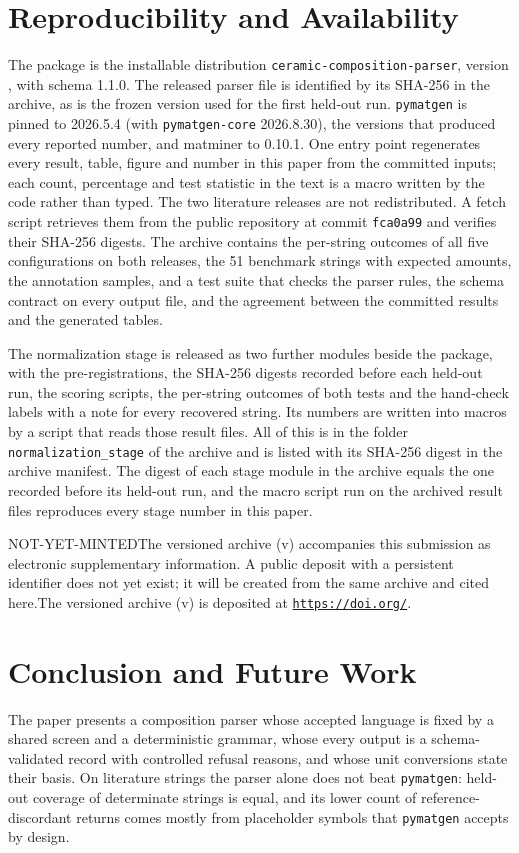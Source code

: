\documentclass[10pt,journal]{IEEEtran}
\newcommand{\pmg}{\texttt{pymatgen}\xspace}
\def\depositdoiPLACEHOLDER{NOT-YET-MINTED}
\newcommand{\depositis}[2]{\ifx\depositdoi\depositdoiPLACEHOLDER #1\else #2\fi}
\newcommand{\depositdoilink}{\href{https://doi.org/\depositdoi}{\texttt{https://doi.org/\depositdoi}}}
\begin{document}
\section{Reproducibility and Availability}
\label{sec:repro}
The package is the installable distribution \texttt{ceramic-composition-parser}, version \ParserVersion, with schema 1.1.0. The released parser file is identified by its SHA-256 in the archive, as is the frozen version used for the first held-out run. \pmg is pinned to 2026.5.4 (with \texttt{pymatgen-core} 2026.8.30), the versions that produced every reported number, and matminer to 0.10.1. One entry point regenerates every result, table, figure and number in this paper from the committed inputs; each count, percentage and test statistic in the text is a macro written by the code rather than typed. The two literature releases are not redistributed. A fetch script retrieves them from the public repository at commit \texttt{fca0a99} and verifies their SHA-256 digests. The archive contains the per-string outcomes of all five configurations on both releases, the 51 benchmark strings with expected amounts, the annotation samples, and a test suite that checks the parser rules, the schema contract on every output file, and the agreement between the committed results and the generated tables.

The normalization stage is released as two further modules beside the package, with the pre-registrations, the SHA-256 digests recorded before each held-out run, the scoring scripts, the per-string outcomes of both tests and the hand-check labels with a note for every recovered string. Its numbers are written into macros by a script that reads those result files. All of this is in the folder \texttt{normalization\_stage} of the archive and is listed with its SHA-256 digest in the archive manifest. The digest of each stage module in the archive equals the one recorded before its held-out run, and the macro script run on the archived result files reproduces every stage number in this paper.

\depositis{The versioned archive (v\ParserVersion) accompanies this submission as electronic supplementary information. A public deposit with a persistent identifier does not yet exist; it will be created from the same archive and cited here.}{The versioned archive (v\ParserVersion) is deposited at \depositdoilink.}

\section{Conclusion and Future Work}
\label{sec:conclusion}
The paper presents a composition parser whose accepted language is fixed by a shared screen and a deterministic grammar, whose every output is a schema-validated record with controlled refusal reasons, and whose unit conversions state their basis. On literature strings the parser alone does not beat \pmg: held-out coverage of determinate strings is equal, and its lower count of reference-discordant returns comes mostly from placeholder symbols that \pmg accepts by design.
\end{document}
